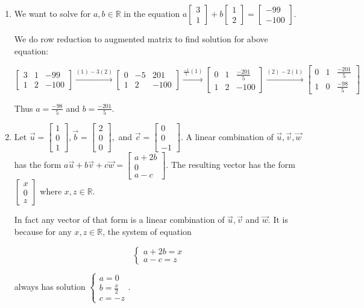 \documentclass[letter]{article}
\newcommand{\mat}[1]{\begin{bmatrix}#1\end{bmatrix}}
\begin{document}
\begin{enumerate}
\begin{enumerate}
				\item We want to solve for $a, b \in \mathbb{R}$ in the equation $a \mat{3 \\ 1} + b \mat{1 \\ 2} = \mat{-99 \\ -100}$.

					We do row reduction to augmented matrix to find solution for above equation:

					$$ \mat{3 & 1 & -99 \\ 1 & 2 & -100} \xrightarrow{(1) - 3(2)} \mat{0 & -5 & 201 \\ 1 & 2 & -100} \xrightarrow{\frac{-1}{5}(1)} \mat{0 & 1 & \frac{-201}{5}\\ 1 & 2 & -100} \xrightarrow{(2) - 2(1)} \mat{0 & 1 & \frac{-201}{5} \\ 1 & 0 & \frac{-98}{5}}$$

					Thus $a = \frac{-98}{5}$ and $b = \frac{-201}{5}$. 

				\item Let $\vec{u} = \mat{1 \\ 0 \\ 1}, \vec{b} = \mat{2 \\ 0 \\ 0},$ and $\vec{c} = \mat{0 \\ 0 \\ -1}$. A linear combination of $\vec{u}, \vec{v}, \vec{w}$ has the form $a \vec{u} + b\vec{v} + c\vec{w} = \mat{a + 2b \\ 0 \\ a-c}$. The resulting vector has the form $\mat{x \\ 0 \\ z}$ where $x, z \in \mathbb{R}$. 

					In fact any vector of that form is a linear combination of $\vec{u}, \vec{v}$ and $\vec{w}$. It is because for any $x, z \in \mathbb{R}$, the system of equation

					$$\begin{cases} a + 2b = x \\ a - c = z \end{cases}$$

					always has solution $\begin{cases} a = 0 \\ b = \frac{x}{2} \\ c = -z \end{cases}$.
			\end{enumerate}
	\end{enumerate}
\end{document}
